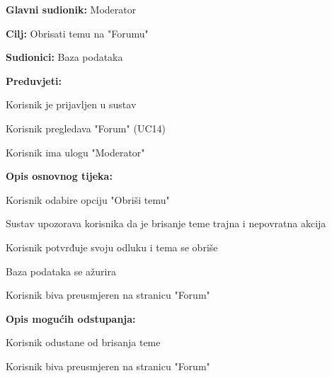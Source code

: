 					\noindent {}
					\begin{packed_item}
	
						\item \textbf{Glavni sudionik: }Moderator
						\item  \textbf{Cilj:} Obrisati temu na "Forumu"
						\item  \textbf{Sudionici:} Baza podataka
						\item  \textbf{Preduvjeti:}
						\item[] \begin{packed_enum}
							\item Korisnik je prijavljen u sustav
							\item Korisnik pregledava "Forum" (UC14)
							\item Korisnik ima ulogu "Moderator"
						\end{packed_enum}
						\item  \textbf{Opis osnovnog tijeka:}
						
						\item[] \begin{packed_enum}
	
							\item Korisnik odabire opciju "Obriši temu"
							\item Sustav upozorava korisnika da je brisanje teme trajna i nepovratna akcija
							\item Korisnik potvrđuje svoju odluku i tema se obriše
							\item Baza podataka se ažurira
							\item Korisnik biva preusmjeren na stranicu "Forum"
						\end{packed_enum}
						
						\item  \textbf{Opis mogućih odstupanja:}
						
						\item[] \begin{packed_item}
	
							\item[3.a] Korisnik odustane od brisanja teme
							\item[] \begin{packed_enum}
								
								\item Korisnik biva preusmjeren na stranicu "Forum"
								
							\end{packed_enum}
							
						\end{packed_item}
					\end{packed_item}					
										
